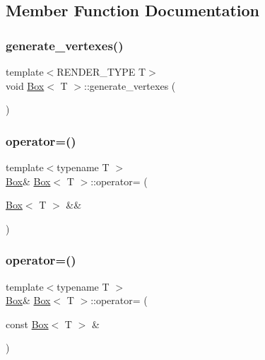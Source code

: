 \subsection{Member Function Documentation}
\mbox{\label{classBox_a7f7b061bf913f9ab47bff75536bc137d}} 
\subsubsection{\texorpdfstring{generate\+\_\+vertexes()}{generate\_vertexes()}}
{\footnotesize\ttfamily template$<$R\+E\+N\+D\+E\+R\+\_\+\+T\+Y\+PE T$>$ \\
void \mbox{\hyperlink{classBox}{Box}}$<$ T $>$\+::generate\+\_\+vertexes (\begin{DoxyParamCaption}{ }\end{DoxyParamCaption})\hspace{0.3cm}{\ttfamily [private]}}

\mbox{\label{classBox_a09995e3360b336b8a477d84804a5a70d}} 
\subsubsection{\texorpdfstring{operator=()}{operator=()}\hspace{0.1cm}{\footnotesize\ttfamily [1/2]}}
{\footnotesize\ttfamily template$<$typename T $>$ \\
\mbox{\hyperlink{classBox}{Box}}\& \mbox{\hyperlink{classBox}{Box}}$<$ T $>$\+::operator= (\begin{DoxyParamCaption}\item[{\mbox{\hyperlink{classBox}{Box}}$<$ T $>$ \&\&}]{ }\end{DoxyParamCaption})\hspace{0.3cm}{\ttfamily [default]}}

\mbox{\label{classBox_a6ea0d233bdcce789b46384d22601da8d}} 
\subsubsection{\texorpdfstring{operator=()}{operator=()}\hspace{0.1cm}{\footnotesize\ttfamily [2/2]}}
{\footnotesize\ttfamily template$<$typename T $>$ \\
\mbox{\hyperlink{classBox}{Box}}\& \mbox{\hyperlink{classBox}{Box}}$<$ T $>$\+::operator= (\begin{DoxyParamCaption}\item[{const \mbox{\hyperlink{classBox}{Box}}$<$ T $>$ \&}]{ }\end{DoxyParamCaption})\hspace{0.3cm}{\ttfamily [default]}}

